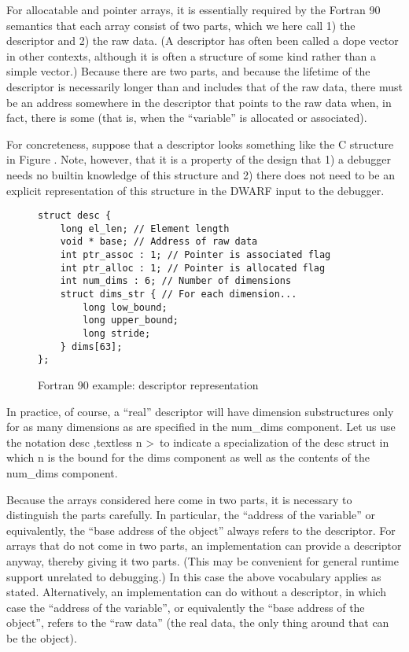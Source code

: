 For allocatable and pointer arrays, it is essentially required
by the Fortran 90 semantics that each array consist of two
parts, which we here call 1) the descriptor and 2) the raw
data. (A descriptor has often been called a dope vector in
other contexts, although it is often a structure of some kind
rather than a simple vector.) Because there are two parts,
and because the lifetime of the descriptor is necessarily
longer than and includes that of the raw data, there must be
an address somewhere in the descriptor that points to the
raw data when, in fact, there is some (that is, when 
the ``variable'' is allocated or associated).

For concreteness, suppose that a descriptor looks something
like the C structure in 
Figure .
Note, however, that it is
a property of the design that 1) a debugger needs no builtin
knowledge of this structure and 2) there does not need to
be an explicit representation of this structure in the DWARF
input to the debugger.

\begin{figure}[here]
\begin{lstlisting}
struct desc {
    long el_len; // Element length
    void * base; // Address of raw data
    int ptr_assoc : 1; // Pointer is associated flag
    int ptr_alloc : 1; // Pointer is allocated flag
    int num_dims : 6; // Number of dimensions
    struct dims_str { // For each dimension...  
        long low_bound;
        long upper_bound;
        long stride;
    } dims[63];
};
\end{lstlisting}
\caption{Fortran 90 example: descriptor representation} \label{fig:fortran90exampledescriptorrepresentation}
\end{figure}


In practice, of course, a “real” descriptor will have
dimension substructures only for as many dimensions as are
specified in the num\_dims component. Let us use the notation
desc ,textless n \textgreater\   
to indicate a specialization of the desc struct in
which n is the bound for the dims component as well as the
contents of the num\_dims component.

Because the arrays considered here come in two parts, it is
necessary to distinguish the parts carefully. In particular,
the “address of the variable” or equivalently, the “base
address of the object” always refers to the descriptor. For
arrays that do not come in two parts, an implementation can
provide a descriptor anyway, thereby giving it two parts. (This
may be convenient for general runtime support unrelated to
debugging.) In this case the above vocabulary applies as
stated. Alternatively, an implementation can do without a
descriptor, in which case the “address of the variable”,
or equivalently the “base address of the object”, refers
to the “raw data” (the real data, the only thing around
that can be the object).

